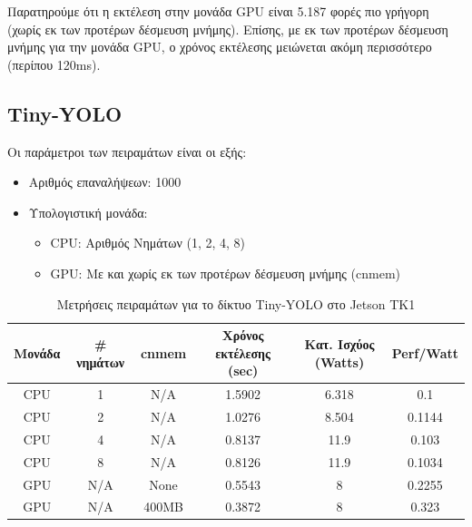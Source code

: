 Παρατηρούμε ότι η εκτέλεση στην μονάδα GPU είναι 5.187 φορές πιο
γρήγορη (χωρίς εκ των προτέρων δέσμευση μνήμης).
Επίσης, με εκ των προτέρων δέσμευση μνήμης για την μονάδα GPU, ο χρόνος εκτέλεσης μειώνεται ακόμη
περισσότερο (περίπου 120ms).




\subsection{Tiny-YOLO}

Οι παράμετροι των πειραμάτων είναι οι εξής:
\begin{itemize}
  \item{Αριθμός επαναλήψεων: 1000}
  \item{Υπολογιστική μονάδα:}
    \begin{itemize}
      \item{CPU: Αριθμός Νημάτων (1, 2, 4, 8)}
      \item{GPU: Με και χωρίς εκ των προτέρων δέσμευση μνήμης (cnmem)}
    \end{itemize}
\end{itemize}

\begin{table}[H]
  \begin{center}
    \caption{Μετρήσεις πειραμάτων για το δίκτυο Tiny-YOLO στο Jetson TK1}
    \label{tab:yolo_jetson}
    \small
    \begin{tabular}[center]{ | c | c | c | c | c | c | }
      \hline
      \rowcolor{Gray}
      Μονάδα & \# νημάτων & cnmem & Χρόνος εκτέλεσης (sec) & Κατ. Ισχύος (Watts) & Perf/Watt \\
      \hline
      CPU & 1 & N/A & 1.5902 & 6.318 & 0.1\\
      CPU & 2 & N/A & 1.0276 & 8.504 & 0.1144\\
      CPU & 4 & N/A & 0.8137 & 11.9 & 0.103\\
      CPU & 8 & N/A & 0.8126 & 11.9 & 0.1034\\
      GPU & N/A & None & 0.5543 & 8 & 0.2255\\
      GPU & N/A & 400MB & 0.3872 & 8 & 0.323\\
      \hline
    \end{tabular}
  \end{center}
\end{table}

